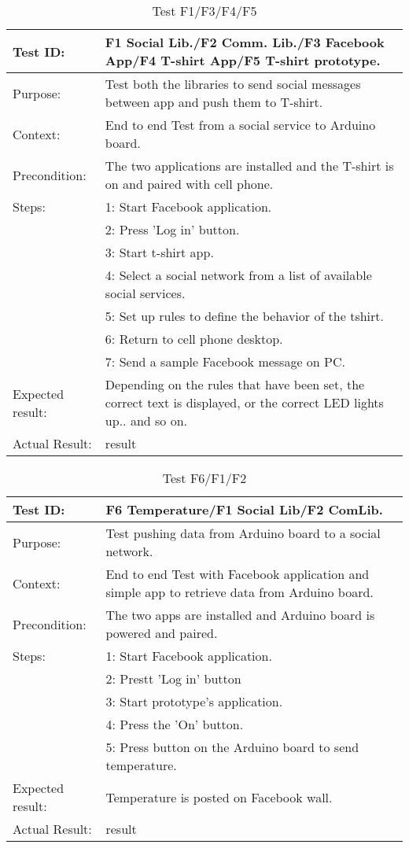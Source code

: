 \begin{table}[h!]
\begin{tabular}{|l|p{10cm}|}
\hline Test ID: & F1 Social Lib./F2 Comm. Lib./F3 Facebook App/F4 T-shirt App/F5 T-shirt prototype. \\ 
\hline Purpose: & Test both the libraries to send social messages between app and push them to T-shirt.  \\ 
\hline Context: & End to end Test from a social service to Arduino board. \\ 
\hline Precondition: & The two applications are installed and the T-shirt is on and paired with cell phone. \\ 
\hline
Steps:
  & 1: Start Facebook application.\\ 
  & 2: Press 'Log in' button. \\ 
  & 3: Start t-shirt app. \\ 
  & 4: Select a social network from a list of available social services. \\
  & 5: Set up rules to define the behavior of the tshirt. \\
  & 6: Return to cell phone desktop. \\
  & 7: Send a sample Facebook message on PC. \\
\hline
Expected result:
   & Depending on the rules that have been set, the correct text is displayed,
   or the correct LED lights up.. and so on.\\ 
\hline
Actual Result:
  &  result \\
\hline
\end{tabular}
\caption{Test F1/F3/F4/F5}
\label{tbl:f1f3f4f5test}
\end{table}

\begin{table}[h!]
\begin{tabular}{|l|p{10cm}|}
\hline Test ID: & F6 Temperature/F1 Social Lib/F2 ComLib. \\ 
\hline Purpose: & Test pushing data from Arduino board to a social network.  \\ 
\hline Context: & End to end Test with Facebook application and simple app to retrieve data from Arduino board. \\ 
\hline Precondition: & The two apps are installed and Arduino board is powered and paired. \\ 
\hline
Steps:
  & 1: Start Facebook application. \\
  & 2: Prestt 'Log in' button\\ 
  & 3: Start prototype's application. \\ 
  & 4: Press the 'On' button. \\
  & 5: Press button on the Arduino board to send temperature. \\ 
\hline
Expected result:
  & Temperature is posted on Facebook wall. \\ 
\hline
Actual Result:
  & result \\
\hline
\end{tabular}
\caption{Test F6/F1/F2}
\label{tbl:f6f1f2test}
\end{table}

